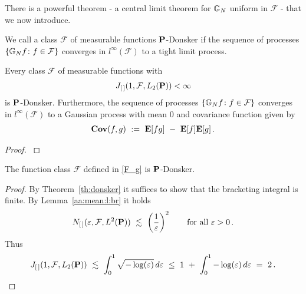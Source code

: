 There is a powerful theorem - a central limit theorem for $\G_N$ uniform in $\mathcal{F}$ - that we now introduce.
\begin{definition}
  We call a class 
  $\mathcal{F}$ of measurable functions 
$\P$-Donsker
if the sequence of processes 
$\left\{ \G_N f \colon f\in\mathcal{F}\right\}$
converges in
$l^\infty(\mathcal{F})$
to a tight limit process.
\end{definition}

\begin{theorem}
  \label{th:donsker}
  Every class $\mathcal{F}$ of measurable functions 
  with
  \begin{gather*}
    J
    _{[\,]}
    (
    1
    ,
    \mathcal{F}
    ,
    L_2(\P)
    )
    <\infty
  \end{gather*}
  is
  $\P$-Donsker.
  Furthermore,
  the sequence of processes 
$\left\{ \G_N f \colon f\in\mathcal{F}\right\}$
  converges 
  in
$l^\infty(\mathcal{F})$
to a Gaussian process with mean 0 and covariance function given by
\begin{gather*}
  \mathbf{Cov}(f,g)
  \ 
  :=
  \ 
  \E[fg]
  \ 
  -
  \ 
  \E[f]\E[g]
  \,.
\end{gather*}
\end{theorem}
\begin{proof}
  \cite[Theorem~19.5]{Vaart2000}
\end{proof}
\begin{lemma}
  \label{lem:F_P_donsker}
The function class $\mathcal{F}$ defined in \eqref{F_g} is $\P$-Donsker. 
\end{lemma}
\begin{proof}
  By Theorem~\ref{th:donsker} it suffices to show that the bracketing integral is finite.
  By Lemma~\ref{aa:mean:l:br} it holds 
  \begin{gather*}
    N_{[\,]}
    (
    \varepsilon
    ,
    \mathcal{F}, L^2(\P))
    \ 
    \lesssim
    \ 
    \left( 
      \frac{1}{\varepsilon}
    \right)^2
    \qquad
    \text{for all}
    \ 
    \varepsilon>0
    \,.
  \end{gather*}
Thus
\begin{align*}
    J
    _{[\,]}
    (
    1
    ,
    \mathcal{F}
    ,
    L_2(\P)
    )
    \ 
    \lesssim
    \ 
    \int_0^1
    \sqrt{
    -\log(\varepsilon)
  }
    \,
    d\varepsilon
    \ 
    \le
    \ 
    1
    \ 
    +
    \ 
    \int_0^1
    -\log(\varepsilon)
    \,
    d\varepsilon
    \ 
    =
    \ 
    2
    \,.
\end{align*}
\end{proof}
